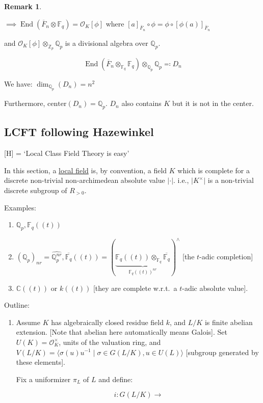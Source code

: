 \documentclass{article}
\theoremstyle{definition}
\numberwithin{theorem}{subsection}
\newtheorem*{remark}{Remark}
\begin{document}
\begin{remark}
\begin{enumerate}[label=\arabic*)]
            \(\implies \operatorname{End}(\overline{F}_n \otimes \mathbb{F}_q) = \mathcal{O}_K[\phi]\) where \([a]_{\overline{F}_n} \circ \phi = \phi \circ [\phi(a)]_{\overline{F}_n}\)
            
            and \(\mathcal{O}_K[\phi]\otimes_{\mathbb{Z}_p} \mathbb{Q}_p\) is a divisional algebra over \(\mathbb{Q}_p\).

            \[
                \operatorname{End}(\overline{F}_n \otimes_{\mathbb{F}_q}\mathbb{F}_q) \otimes_{\mathbb{Q}_p} \mathbb{Q}_p \eqqcolon D_n  
            \]

            We have: \(\dim_{\mathbb{Q}_p}(D_n) = n^2\) 
            
            Furthermore, \(\text{center}(D_n) = \mathbb{Q}_p\). \(D_n\) also contains \(K\) but it is not in the center.  
        \end{enumerate} 
    \end{remark}

    \subsection{LCFT following Hazewinkel}

    [H] = `Local Class Field Theory is easy'

    In this section, a \underline{local field} is, by convention, a field \(K\) which is complete for a discrete non-trivial non-archimedean absolute value \(\vert \cdot \vert\). i.e., \(\vert K^\times \vert\) is a non-trivial discrete subgroup of \(R_{> 0}\).

    Examples:

    \begin{enumerate}[label=\arabic*)]
        \item \(\mathbb{Q}_p, \mathbb{F}_{q}((t))\)
        \item \((\mathbb{Q}_p)_{nr} = \widehat{\mathbb{Q}_p^{nr}}, \overline{\mathbb{F}_q}((t)) = (\underbrace{\mathbb{F}_q((t)) \otimes_{\mathbb{F}_q} \overline{\mathbb{F}_q}}_{\mathbb{F}_q((t))^{nr}})^\wedge\) [the \(t\)-adic completion]
        \item \(\mathbb{C}((t))\) or \(k((t))\) [they are complete w.r.t.\ a \(t\)-adic absolute value].
    \end{enumerate} 

    Outline:

    \begin{enumerate}[label=\arabic*)]
        \item Assume \(K\) has algebraically closed residue field \(k\), and \(L / K\) is finite abelian extension. [Note that abelian here automatically means Galois]. Set \(U(K) = \mathcal{O}_K^\times\), units of the valuation ring, and \(V(L / K) = \langle \sigma (u) u ^{-1} \mid \sigma \in G(L / K), u \in U(L) \rangle\) [subgroup generated by these elements].
        
        Fix a uniformizer \(\pi_L\) of \(L\) and define:

        \[
            i: G(L / K) \to 
        \]
        
    \end{enumerate} 
\end{document}
